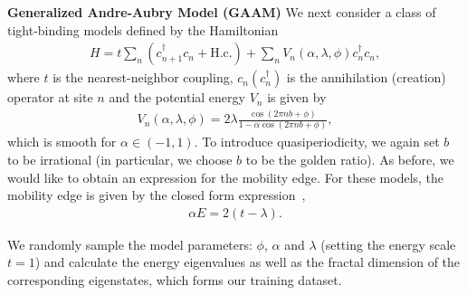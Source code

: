 \documentclass{article}
\numberwithin{equation}{section}
\numberwithin{figure}{section}
\begin{document}
{\bf Generalized Andre-Aubry Model (GAAM)} We next consider a class of tight-binding models defined by the Hamiltonian~\cite{ME_ganeshan2015nearest}
\begin{align}
    H = t\sum_n \left( c^\dag_{n+1} c_n + \text{H.c.}\right) + \sum_n V_n(\alpha, \lambda, \phi) c^\dag_n c_n,
\end{align}
where $t$ is the nearest-neighbor coupling, $c_n (c^\dag_n)$ is the annihilation (creation) operator at site $n$ and the potential energy $V_n$ is given by
\begin{align}
    V_n(\alpha, \lambda, \phi) = 2\lambda \frac{\cos(2\pi n b + \phi)}{1-\alpha \cos(2\pi n b + \phi)},
\end{align}
which is smooth for $\alpha \in (-1, 1)$. To introduce quasiperiodicity, we again set $b$ to be irrational (in particular, we choose $b$ to be the golden ratio). As before, we would like to obtain an expression for the mobility edge. For these models, the mobility edge is given by the closed form expression~\cite{ME_ganeshan2015nearest, ME_wang2021duality},
\begin{align}\label{eq:gaam-me}
    \alpha E = 2(t-\lambda).
\end{align}

We randomly sample the model parameters: $\phi$, $\alpha$ and $\lambda$ (setting the energy scale $t=1$) and calculate the energy eigenvalues as well as the fractal dimension of the corresponding eigenstates, which forms our training dataset.
\end{document}
